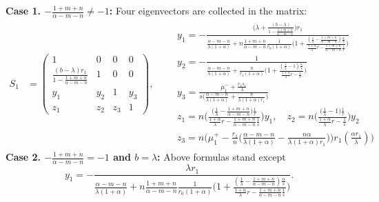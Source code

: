 \documentclass[a4paper,11pt]{article}
\begin{document}
\begin{itemize}
{\bf Case 1. $-\frac{1+m+n}{\alpha-m-n}\ne -1$: }
Four eigenvectors are collected in the matrix:
\begin{align*}
 S_1&=
 \begin{pmatrix}
    1 & 0 & 0 & 0\\
    \frac{(b-\lambda)r_1}{1-\frac{1+m+n}{\alpha-m-n}} & 1 & 0 & 0\\
    y_1 & y_2 & 1 & y_3\\
    z_1 & z_2 & z_3 &1
 \end{pmatrix}, \quad \quad 
 \begin{array}{l}
 y_1=-\frac{\Big(\lambda + \frac{(b-\lambda)}{1-\frac{1+m+n}{\alpha-m-n}}\Big)r_1}{\frac{\alpha-m-n}{\lambda(1+\alpha)} + n\frac{1+m+n}{\alpha-m-n}\frac{1}{r_0(1+\alpha)}\Big(1 + \frac{(\frac{1}{\lambda}-\frac{1+m+n}{\alpha-m-n})\frac{\alpha}{s}}{ \frac{1+\alpha}{\lambda}r -\frac{1+m+n}{\alpha-m-n} \frac{1}{s} }\Big) }\\
 y_2=-\frac{1}{\frac{\alpha-m-n}{\lambda(1+\alpha)} + \frac{n}{r_1(1+\alpha)}\Big(1 + \frac{(\frac{1}{\lambda}-1)\frac{\alpha}{s}}{ \frac{1+\alpha}{\lambda}r - \frac{1}{s} }\Big) }\\
 y_3=\frac{\mu_1^- +\frac{r_1s_1}{\lambda}}{s\Big(\frac{\alpha-m-n}{\lambda(1+\alpha)} + \frac{n}{\lambda(1+\alpha)r_1}\Big)}\\
 z_1=n\bigg(\frac{\big(\frac{1}{\lambda}-\frac{1+m+n}{\alpha-m-n}\big)\frac{1}{r}}{ \frac{1+\alpha}{\lambda}r -\frac{1+m+n}{\alpha-m-n} \frac{1}{s} }\bigg)y_1, \quad
 z_2=n\bigg(\frac{\big(\frac{1}{\lambda}-1\big)\frac{1}{r}}{ \frac{1+\alpha}{\lambda}r - \frac{1}{s} }\bigg)y_2 \\
 z_3=n\bigg(\mu_1^+-\frac{r_1}{n}\Big(\frac{\alpha-m-n}{\lambda(1+\alpha)} - \frac{n\alpha}{\lambda(1+\alpha)r_1}\Big)\bigg)r_1(\frac{\alpha r_1}{\lambda})\bigg)
 \end{array}
\end{align*}
{\bf Case 2. $-\frac{1+m+n}{\alpha-m-n}= -1$ and $b=\lambda$: }
Above formulas stand except 
$$y_1 = -\frac{\lambda r_1}{\frac{\alpha-m-n}{\lambda(1+\alpha)} + n\frac{1+m+n}{\alpha-m-n}\frac{1}{r_0(1+\alpha)}\Big(1 + \frac{(\frac{1}{\lambda}-\frac{1+m+n}{\alpha-m-n})\frac{\alpha}{s}}{ \frac{1+\alpha}{\lambda}r -\frac{1+m+n}{\alpha-m-n} \frac{1}{s} }\Big) }.$$


\end{itemize}
\end{document}
